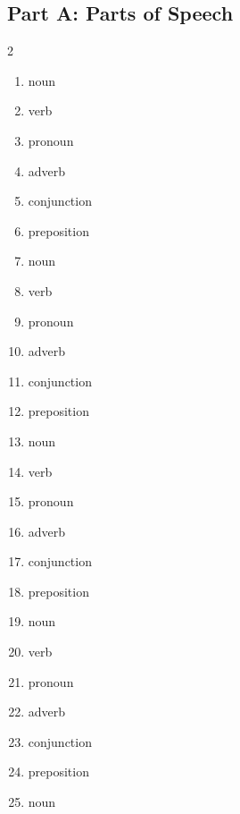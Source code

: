 \documentclass[11pt]{article}
\begin{document}
\subsection*{Part A: Parts of Speech}
\begin{multicols}{2}
\begin{enumerate}
  \item noun
  \item verb
  \item pronoun
  \item adverb
  \item conjunction
  \item preposition
  \item noun
  \item verb
  \item pronoun
  \item adverb
  \item conjunction
  \item preposition
  \item noun
  \item verb
  \item pronoun
  \item adverb
  \item conjunction
  \item preposition
  \item noun
  \item verb
  \item pronoun
  \item adverb
  \item conjunction
  \item preposition
  \item noun
\end{enumerate}
\end{multicols}
\end{document}
